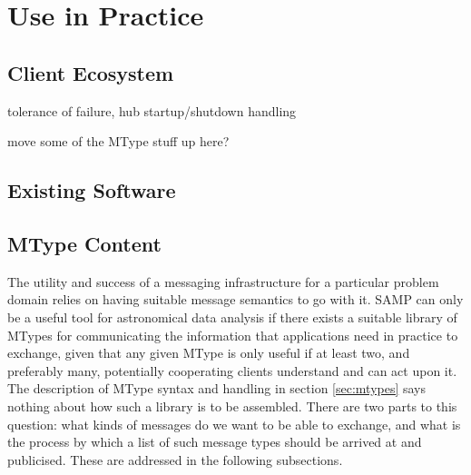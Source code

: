 \documentclass[5p]{elsarticle}
\newcommand{\todo}{\color{gray}}
\begin{document}


\section{Use in Practice} \label{sec:usage}

\subsection{Client Ecosystem}

{\todo tolerance of failure, hub startup/shutdown handling}

{\todo move some of the MType stuff up here?}

\subsection{Existing Software}

\subsection{MType Content}

The utility and success of a messaging infrastructure for
a particular problem domain relies on having suitable
message semantics to go with it.
SAMP can only be a useful tool for astronomical data analysis
if there exists a suitable library of MTypes for communicating
the information that applications need in practice to exchange,
given that any given MType is only useful if at least two,
and preferably many, potentially cooperating clients
understand and can act upon it.
The description of MType syntax and handling in section \ref{sec:mtypes}
says nothing about how such a library is to be assembled.
There are two parts to this question:
what kinds of messages do we want to be able to exchange,
and what is the process by which a list of such message types
should be arrived at and publicised.
These are addressed in the following subsections.
\end{document}
